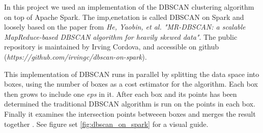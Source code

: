 In this project we used an implementation of the DBSCAN clustering algorithm on top of Apache Spark. The imp,enetation is called DBSCAN on Spark \cite{dbscan_on_spark} and loosely based on the paper from \textit{He, Yaobin, et al. "MR-DBSCAN: a scalable MapReduce-based DBSCAN algorithm for heavily skewed data"}. The public repository is maintained by Irving Cordova, and accessible on github (\textit{https://github.com/irvingc/dbscan-on-spark}).
 
  This implementation of DBSCAN runs in parallel by splitting the data space into boxes, using the number of boxes as a cost estimator for the algorithm. Each box then grows to include one \textit{eps} in it. After each box and its points has been determined the traditional DBSCAN algorithm is run on the points in each box. Finally it examines the intersection points betweeen boxes and merges the result together \cite{vis_dbscan_on_spark}. See figure set \autoref{fig:dbscan_on_spark} for a visual guide. 
 
